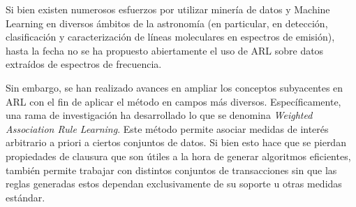 Si bien existen numerosos esfuerzos por utilizar minería de datos y Machine Learning en diversos ámbitos de la astronomía (en particular, en detección, clasificación y caracterización de líneas moleculares en espectros de emisión\cite{vskoda2011searching}), hasta la fecha no se ha propuesto abiertamente el uso de ARL sobre datos extraídos de espectros de frecuencia.

Sin embargo, se han realizado avances en ampliar los conceptos subyacentes en ARL con el fin de aplicar el método en campos más diversos\cite{brin1997beyond}. Específicamente, una rama de investigación ha desarrollado lo que se denomina \textit{Weighted Association Rule Learning}\cite{wang2000efficient}\cite{cai1998mining}. Este método permite asociar medidas de interés arbitrario a priori a ciertos conjuntos de datos. Si bien esto hace que se pierdan propiedades de clausura que son útiles a la hora de generar algoritmos eficientes, también permite trabajar con distintos conjuntos de transacciones sin que las reglas generadas estos dependan exclusivamente de su soporte u otras medidas estándar.

